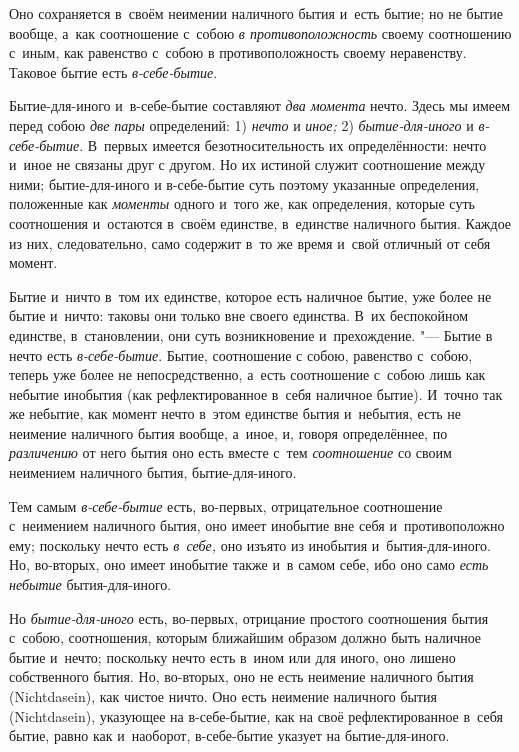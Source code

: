 Оно сохраняется в~своём неимении наличного бытия и~есть бытие; но не бытие
вообще, а~как соотношение с~собою {\em в
противоположность} своему соотношению с~иным, как равенство с~собою в
противоположность своему неравенству. Таковое бытие есть
{\em в-себе-бытие}.

Бытие-для-иного и~в-себе-бытие составляют {\em два момента} нечто. Здесь
мы имеем перед собою {\em две пары} определений: 1) {\em нечто} и
{\em иное;} 2) {\em бытие-для-иного} и {\em в-себе-бытие}. В~первых имеется
безотносительность их определённости: нечто и~иное не связаны друг с
другом. Но их истиной служит соотношение между ними; бытие-для-иного и
в-себе-бытие суть поэтому указанные определения, положенные как
{\em моменты} одного и~того же, как определения,
которые суть соотношения и~остаются в~своём единстве, в~единстве наличного
бытия. Каждое из них, следовательно, само содержит в~то же время
и~свой отличный от себя момент.

Бытие и~ничто в~том их единстве, которое есть наличное бытие, уже более не
бытие и~ничто: таковы они только вне своего единства. В~их беспокойном
единстве, в~становлении, они суть возникновение и~прехождение. "--- Бытие в
нечто есть {\em в-себе-бытие}. Бытие, соотношение с
собою, равенство с~собою, теперь уже более не непосредственно, а~есть
соотношение с~собою лишь как небытие инобытия (как рефлектированное в~себя
наличное бытие). И~точно так же небытие, как момент нечто в~этом единстве
бытия и~небытия, есть не неимение наличного бытия вообще, а~иное, и,
говоря определённее, по {\em различению} от него бытия
оно есть вместе с~тем {\em соотношение} со своим
неимением наличного бытия, бытие-для-иного.

Тем самым {\em в-себе-бытие} есть, во-первых,
отрицательное соотношение с~неимением наличного бытия, оно имеет инобытие
вне себя и~противоположно ему; поскольку нечто есть
{\em в~себе,} оно изъято из инобытия и~бытия-для-иного.
Но, во-вторых, оно имеет инобытие также и~в самом себе, ибо оно
само {\em есть небытие} бытия-для-иного.

Но {\em бытие-для-иного} есть, во-первых, отрицание
простого соотношения бытия с~собою, соотношения, которым ближайшим образом
должно быть наличное бытие и~нечто; поскольку нечто есть в~ином
или для иного, оно лишено собственного бытия. Но, во-вторых,
оно не есть неимение наличного бытия (Nicht\-dasein), как чистое ничто. Оно
есть неимение наличного бытия (Nicht\-dasein), указующее на в-себе-бытие, как
на своё рефлектированное в~себя бытие, равно как и~наоборот, в-себе-бытие
указует на бытие-для-иного.

